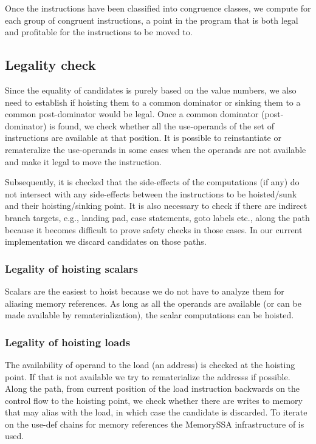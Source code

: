 \documentclass[acmlarge,review,anonymous]{acmart}\settopmatter{printfolios=true}
\begin{document}
Once the instructions have been classified into congruence classes, we compute
for each group of congruent instructions, a point in the program that is both
legal and profitable for the instructions to be moved to.

\subsection{Legality check}
\label{subsec:legality}
Since the equality of candidates is purely based on the value numbers, we also
need to establish if hoisting them to a common dominator or sinking them to a
common post-dominator would be legal. Once a common dominator (post-dominator)
is found, we check whether all the use-operands of the set of instructions are
available at that position. It is possible to reinstantiate or remateralize the
use-operands in some cases when the operands are not available and make it legal
to move the instruction.

Subsequently, it is checked that the side-effects of the computations (if any)
do not intersect with any side-effects between the instructions to be
hoisted/sunk and their hoisting/sinking point. It is also necessary to check if
there are indirect branch targets, e.g., landing pad, case statements, goto
labels etc., along the path because it becomes difficult to prove safety checks
in those cases. In our current implementation we discard candidates on those
paths.

\subsubsection{Legality of hoisting scalars}
Scalars are the easiest to hoist because we do not have to analyze them for
aliasing memory references. As long as all the operands are available (or can be
made available by rematerialization), the scalar computations can be hoisted.

\subsubsection{Legality of hoisting loads}
The availability of operand to the load (an address) is checked at the hoisting
point. If that is not available we try to rematerialize the addresss if
possible.  Along the path, from current position of the load instruction
backwards on the control flow to the hoisting point, we check whether there are
writes to memory that may alias with the load, in which case the candidate is
discarded. To iterate on the use-def chains for memory references the MemorySSA
infrastructure of \LLVM{} is used.
\end{document}
